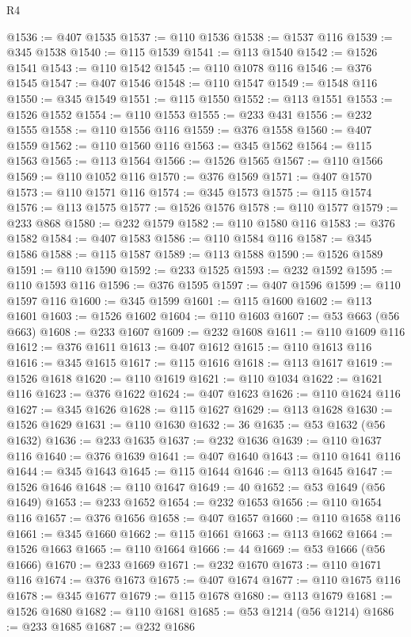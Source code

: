 \begin{lexlean}{R4}
\begin{coremodule}
@1536 := @407 @1535
@1537 := @110 @1536
@1538 := @1537 @116
@1539 := @345 @1538
@1540 := @115 @1539
@1541 := @113 @1540
@1542 := @1526 @1541
@1543 := @110 @1542
@1545 := @110 @1078 @116
@1546 := @376 @1545
@1547 := @407 @1546
@1548 := @110 @1547
@1549 := @1548 @116
@1550 := @345 @1549
@1551 := @115 @1550
@1552 := @113 @1551
@1553 := @1526 @1552
@1554 := @110 @1553
@1555 := @233 @431
@1556 := @232 @1555
@1558 := @110 @1556 @116
@1559 := @376 @1558
@1560 := @407 @1559
@1562 := @110 @1560 @116
@1563 := @345 @1562
@1564 := @115 @1563
@1565 := @113 @1564
@1566 := @1526 @1565
@1567 := @110 @1566
@1569 := @110 @1052 @116
@1570 := @376 @1569
@1571 := @407 @1570
@1573 := @110 @1571 @116
@1574 := @345 @1573
@1575 := @115 @1574
@1576 := @113 @1575
@1577 := @1526 @1576
@1578 := @110 @1577
@1579 := @233 @868
@1580 := @232 @1579
@1582 := @110 @1580 @116
@1583 := @376 @1582
@1584 := @407 @1583
@1586 := @110 @1584 @116
@1587 := @345 @1586
@1588 := @115 @1587
@1589 := @113 @1588
@1590 := @1526 @1589
@1591 := @110 @1590
@1592 := @233 @1525
@1593 := @232 @1592
@1595 := @110 @1593 @116
@1596 := @376 @1595
@1597 := @407 @1596
@1599 := @110 @1597 @116
@1600 := @345 @1599
@1601 := @115 @1600
@1602 := @113 @1601
@1603 := @1526 @1602
@1604 := @110 @1603
@1607 := @53 @663 (@56 @663)
@1608 := @233 @1607
@1609 := @232 @1608
@1611 := @110 @1609 @116
@1612 := @376 @1611
@1613 := @407 @1612
@1615 := @110 @1613 @116
@1616 := @345 @1615
@1617 := @115 @1616
@1618 := @113 @1617
@1619 := @1526 @1618
@1620 := @110 @1619
@1621 := @110 @1034
@1622 := @1621 @116
@1623 := @376 @1622
@1624 := @407 @1623
@1626 := @110 @1624 @116
@1627 := @345 @1626
@1628 := @115 @1627
@1629 := @113 @1628
@1630 := @1526 @1629
@1631 := @110 @1630
@1632 := 36
@1635 := @53 @1632 (@56 @1632)
@1636 := @233 @1635
@1637 := @232 @1636
@1639 := @110 @1637 @116
@1640 := @376 @1639
@1641 := @407 @1640
@1643 := @110 @1641 @116
@1644 := @345 @1643
@1645 := @115 @1644
@1646 := @113 @1645
@1647 := @1526 @1646
@1648 := @110 @1647
@1649 := 40
@1652 := @53 @1649 (@56 @1649)
@1653 := @233 @1652
@1654 := @232 @1653
@1656 := @110 @1654 @116
@1657 := @376 @1656
@1658 := @407 @1657
@1660 := @110 @1658 @116
@1661 := @345 @1660
@1662 := @115 @1661
@1663 := @113 @1662
@1664 := @1526 @1663
@1665 := @110 @1664
@1666 := 44
@1669 := @53 @1666 (@56 @1666)
@1670 := @233 @1669
@1671 := @232 @1670
@1673 := @110 @1671 @116
@1674 := @376 @1673
@1675 := @407 @1674
@1677 := @110 @1675 @116
@1678 := @345 @1677
@1679 := @115 @1678
@1680 := @113 @1679
@1681 := @1526 @1680
@1682 := @110 @1681
@1685 := @53 @1214 (@56 @1214)
@1686 := @233 @1685
@1687 := @232 @1686

\end{coremodule}
\end{lexlean}
